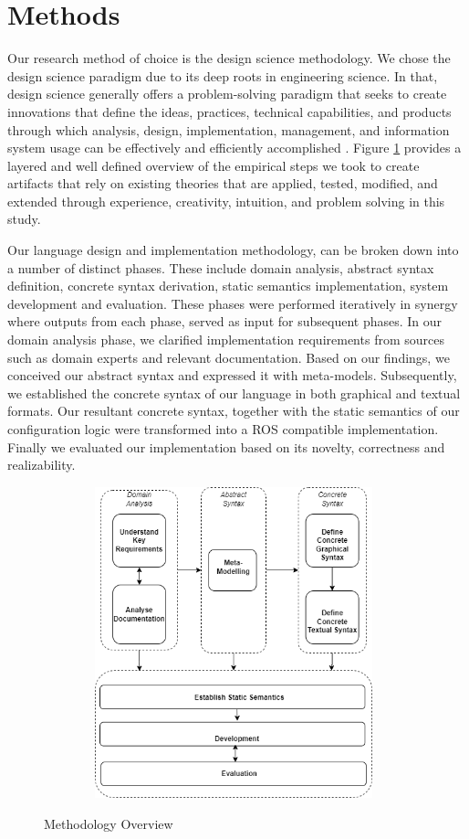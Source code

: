 \documentclass[conference]{IEEEtran}
\begin{document}
\section{Methods}
Our research method of choice is the design science methodology. We chose the design science paradigm due to its deep roots in engineering science. In that, design science generally offers a problem-solving paradigm that seeks to create innovations that define the ideas, practices, technical capabilities, and products through which analysis, design, implementation, management, and information system usage can be effectively and efficiently accomplished  \cite{des-res}. Figure \ref{methover} provides a layered and well defined overview of the empirical steps we took to create artifacts that rely on existing theories that are applied, tested, modified, and extended through experience, creativity, intuition, and problem solving in this study.

Our language design and implementation methodology, can be broken down into a number of distinct phases. These include domain analysis, abstract syntax definition, concrete syntax derivation, static semantics implementation, system development and evaluation. These phases were performed iteratively in synergy where outputs from each phase, served as input for subsequent phases. In our domain analysis phase, we clarified implementation requirements from sources such as domain experts and relevant documentation. Based on our findings, we conceived our abstract syntax and expressed it with meta-models. Subsequently, we established the concrete syntax of our language in both graphical and textual formats. Our resultant concrete syntax, together with the static semantics of our configuration logic were transformed into a ROS compatible implementation. Finally we evaluated our implementation based on its novelty, correctness and realizability.

\begin{figure}[H]
\caption{Methodology Overview}
\centering
\includegraphics[keepaspectratio,height=9cm, width=11cm]{diagrams/methods.png}
\label{methover}
\end{figure}
\end{document}
